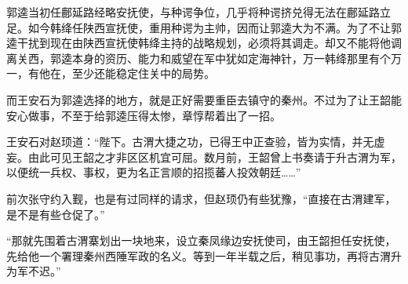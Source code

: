 郭逵当初任鄜延路经略安抚使，与种谔争位，几乎将种谔挤兑得无法在鄜延路立足。如今韩绛任陕西宣抚使，重用种谔为主帅，因而让郭逵大为不满。为了不让郭逵干扰到现在由陕西宣抚使韩绛主持的战略规划，必须将其调走。却又不能将他调离关西，郭逵本身的资历、能力和威望在军中犹如定海神针，万一韩绛那里有个万一，有他在，至少还能稳定住关中的局势。

而王安石为郭逵选择的地方，就是正好需要重臣去镇守的秦州。不过为了让王韶能安心做事，不至于给郭逵压得太惨，章惇帮着出了一招。

王安石对赵顼道：“陛下。古渭大捷之功，已得王中正查验，皆为实情，并无虚妄。由此可见王韶之才非区区机宜可屈。数月前，王韶曾上书奏请于升古渭为军，以便统一兵权、事权，更为名正言顺的招揽蕃人投效朝廷……”

前次张守约入觐，也是有过同样的请求，但赵顼仍有些犹豫，“直接在古渭建军，是不是有些仓促了。”

“那就先围着古渭寨划出一块地来，设立秦凤缘边安抚使司，由王韶担任安抚使，先给他一个署理秦州西陲军政的名义。等到一年半载之后，稍见事功，再将古渭升为军不迟。”

